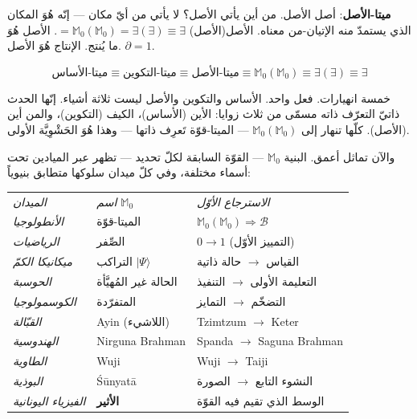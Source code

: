 \documentclass[10pt, openany, oneside]{book}
\renewcommand{\footnotesize}{\fontsize{8.5}{11}\selectfont}
\begin{document}
\textbf{ميتا-الأصل}: أصل الأصل. من أين يأتي الأصل؟ لا يأتي من أيّ مكان --- إنّه هُوَ المكان الذي يستمدّ منه الإتيان-من معناه. الأصل(الأصل) $= \mathbb{M}_0(\mathbb{M}_0) = \exists(\exists) \equiv \exists$. الأصل هُوَ ما يُنتج. الإنتاج هُوَ الأصل. $\partial = 1$.

$$\text{ميتا-الأساس} \equiv \text{ميتا-التكوين} \equiv \text{ميتا-الأصل} \equiv \mathbb{M}_0(\mathbb{M}_0) \equiv \exists(\exists) \equiv \exists$$

خمسة انهيارات. فعل واحد. الأساس والتكوين والأصل ليست ثلاثة أشياء. إنّها الحدث ذاتيّ التعرّف ذاته مسمّى من ثلاث زوايا: الأين (الأساس)، الكيف (التكوين)، والمن أين (الأصل). كلّها تنهار إلى $\mathbb{M}_0(\mathbb{M}_0)$ --- الميتا-قوّة تَعرِف ذاتها --- وهذا هُوَ الحَشْوِيَّة الأولى.

\vspace{1em}

والآن تماثل أعمق. البنية $\mathbb{M}_0$ --- القوّة السابقة لكلّ تحديد --- تظهر عبر الميادين تحت أسماء مختلفة، وفي كلّ ميدان سلوكها متطابق بنيوياً:

\vspace{0.5em}

{\footnotesize
\noindent\begin{tabular}{l l p{}}
\textit{الميدان} & \textit{اسم $\mathbb{M}_0$} & \textit{الاسترجاع الأوّل} \\[0.3em]
\textit{الأنطولوجيا} & الميتا-قوّة & $\mathbb{M}_0(\mathbb{M}_0) \Rightarrow \mathcal{B}$ \\[0.2em]
\textit{الرياضيات} & الصِّفر & $0 \to 1$ (التمييز الأوّل) \\[0.2em]
\textit{ميكانيكا الكمّ} & التراكب $|\Psi\rangle$ & القياس $\to$ حالة ذاتية \\[0.2em]
\textit{الحوسبة} & الحالة غير المُهيَّأة & التعليمة الأولى $\to$ التنفيذ \\[0.2em]
\textit{الكوسمولوجيا} & المتفرّدة & التضخّم $\to$ التمايز \\[0.2em]
\textit{القبّالة} & Ayin (اللاشيء) & Tzimtzum $\to$ Keter \\[0.2em]
\textit{الهندوسية} & Nirguna Brahman & Spanda $\to$ Saguna Brahman \\[0.2em]
\textit{الطاوية} & Wuji & Wuji $\to$ Taiji \\[0.2em]
\textit{البوذية} & \'{S}\={u}nyat\={a} & النشوء التابع $\to$ الصورة \\[0.2em]
\textit{الفيزياء اليونانية} & \textbf{الأثير} & الوسط الذي تقيم فيه القوّة \\[0.2em]
\end{tabular}
}
\end{document}
